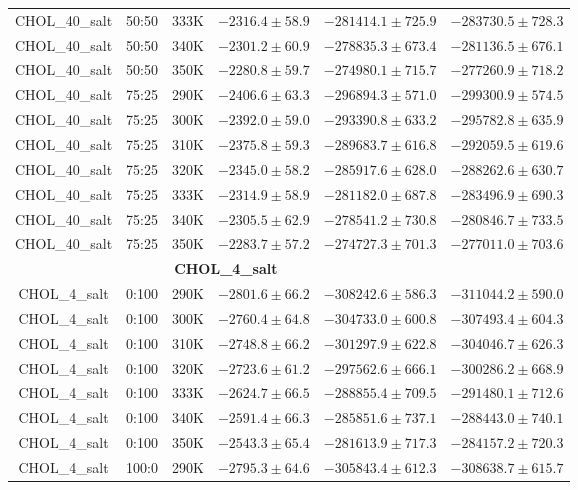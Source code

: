 \begin{longtable}{|c|c|c|c|c|c|}
CHOL\_40\_salt & 50:50 & 333K & $-2316.4 \pm 58.9$ & $-281414.1 \pm 725.9$ & $-283730.5 \pm 728.3$ \\
CHOL\_40\_salt & 50:50 & 340K & $-2301.2 \pm 60.9$ & $-278835.3 \pm 673.4$ & $-281136.5 \pm 676.1$ \\
CHOL\_40\_salt & 50:50 & 350K & $-2280.8 \pm 59.7$ & $-274980.1 \pm 715.7$ & $-277260.9 \pm 718.2$ \\
CHOL\_40\_salt & 75:25 & 290K & $-2406.6 \pm 63.3$ & $-296894.3 \pm 571.0$ & $-299300.9 \pm 574.5$ \\
CHOL\_40\_salt & 75:25 & 300K & $-2392.0 \pm 59.0$ & $-293390.8 \pm 633.2$ & $-295782.8 \pm 635.9$ \\
CHOL\_40\_salt & 75:25 & 310K & $-2375.8 \pm 59.3$ & $-289683.7 \pm 616.8$ & $-292059.5 \pm 619.6$ \\
CHOL\_40\_salt & 75:25 & 320K & $-2345.0 \pm 58.2$ & $-285917.6 \pm 628.0$ & $-288262.6 \pm 630.7$ \\
CHOL\_40\_salt & 75:25 & 333K & $-2314.9 \pm 58.9$ & $-281182.0 \pm 687.8$ & $-283496.9 \pm 690.3$ \\
CHOL\_40\_salt & 75:25 & 340K & $-2305.5 \pm 62.9$ & $-278541.2 \pm 730.8$ & $-280846.7 \pm 733.5$ \\
CHOL\_40\_salt & 75:25 & 350K & $-2283.7 \pm 57.2$ & $-274727.3 \pm 701.3$ & $-277011.0 \pm 703.6$ \\
\midrule \multicolumn{5}{c}{\textbf{CHOL\_4\_salt}} \\ \midrule
CHOL\_4\_salt & 0:100 & 290K & $-2801.6 \pm 66.2$ & $-308242.6 \pm 586.3$ & $-311044.2 \pm 590.0$ \\
CHOL\_4\_salt & 0:100 & 300K & $-2760.4 \pm 64.8$ & $-304733.0 \pm 600.8$ & $-307493.4 \pm 604.3$ \\
CHOL\_4\_salt & 0:100 & 310K & $-2748.8 \pm 66.2$ & $-301297.9 \pm 622.8$ & $-304046.7 \pm 626.3$ \\
CHOL\_4\_salt & 0:100 & 320K & $-2723.6 \pm 61.2$ & $-297562.6 \pm 666.1$ & $-300286.2 \pm 668.9$ \\
CHOL\_4\_salt & 0:100 & 333K & $-2624.7 \pm 66.5$ & $-288855.4 \pm 709.5$ & $-291480.1 \pm 712.6$ \\
CHOL\_4\_salt & 0:100 & 340K & $-2591.4 \pm 66.3$ & $-285851.6 \pm 737.1$ & $-288443.0 \pm 740.1$ \\
CHOL\_4\_salt & 0:100 & 350K & $-2543.3 \pm 65.4$ & $-281613.9 \pm 717.3$ & $-284157.2 \pm 720.3$ \\
CHOL\_4\_salt & 100:0 & 290K & $-2795.3 \pm 64.6$ & $-305843.4 \pm 612.3$ & $-308638.7 \pm 615.7$ \\

\end{longtable}
